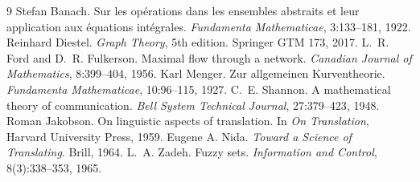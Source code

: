 \documentclass[11pt,a4paper]{article}
\theoremstyle{thmstyle}
\theoremstyle{definition}
\theoremstyle{remark}
\begin{document}

\begin{thebibliography}{9}
 Stefan Banach. Sur les op\'erations dans
les ensembles abstraits et leur application aux \'equations int\'egrales.
\emph{Fundamenta Mathematicae}, 3:133--181, 1922.
 Reinhard Diestel.
\emph{Graph Theory}, 5th edition. Springer GTM 173, 2017.
 L.~R. Ford and
D.~R. Fulkerson. Maximal flow through a network.
\emph{Canadian Journal of Mathematics}, 8:399--404, 1956.
 Karl Menger. Zur allgemeinen
Kurventheorie. \emph{Fundamenta Mathematicae}, 10:96--115, 1927.
 C.~E. Shannon. A mathematical theory of
communication. \emph{Bell System Technical Journal}, 27:379--423, 1948.
 Roman Jakobson. On linguistic aspects
of translation. In \emph{On Translation}, Harvard University Press, 1959.
 Eugene A. Nida. \emph{Toward a Science of
Translating}. Brill, 1964.
 L.~A. Zadeh. Fuzzy sets.
\emph{Information and Control}, 8(3):338--353, 1965.
\end{thebibliography}
\end{document}
